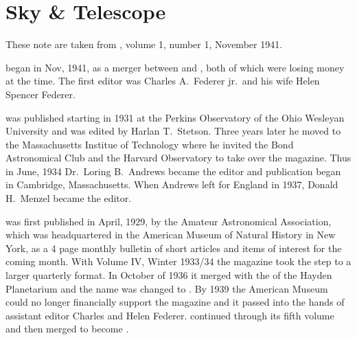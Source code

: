 \section{Sky \& Telescope}

These note are taken from , volume 1, number 1,
November 1941.

 began in Nov, 1941, as a merger between  and , both of which were losing money at the
time.  The first editor was Charles A.~Federer jr.\ and his wife Helen
Spencer Federer.

 was published starting in 1931 at
the Perkins Observatory of the Ohio Wesleyan University and was edited
by Harlan T.~Stetson. Three years later he moved to the Massachusetts
Institue of Technology where he invited the Bond Astronomical Club and
the Harvard Observatory to take over the magazine. Thus in June, 1934
Dr.~Loring B.~Andrews became the editor and publication began in Cambridge,
Massachusetts.  When Andrews left for England in 1937, Donald H.~Menzel
became the editor.

 was first published in April, 1929, by the
Amateur Astronomical Association, which was headquartered in the American
Museum of Natural History in New York, as a 4 page monthly bulletin of
short articles and items of interest for the coming month.  With
Volume IV, Winter 1933/34 the magazine took the step to a larger
quarterly format.  In October of 1936 it merged with the  of the Hayden Planetarium and the name was changed to
. By 1939 the American Museum could no longer financially
support the magazine and it passed into the hands of assistant
editor Charles and Helen Federer.  continued through
its fifth volume and then merged to become .
